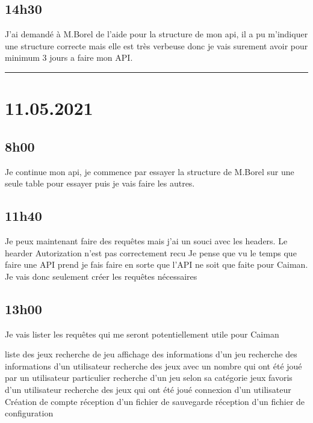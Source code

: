 \documentclass[a4paper,12pt,french]{sphinxmanual}
\begin{document}
\subsection{14h30}
\label{\detokenize{logbook:id95}}
\sphinxAtStartPar
J’ai demandé à M.Borel de l’aide pour la structure de mon api, il a pu m’indiquer une structure correcte mais elle est très verbeuse donc je vais surement avoir pour minimum 3 jours a faire mon API.


\bigskip\hrule\bigskip



\section{11.05.2021}
\label{\detokenize{logbook:id96}}

\subsection{8h00}
\label{\detokenize{logbook:id97}}
\sphinxAtStartPar
Je continue mon api, je commence par essayer la structure de M.Borel sur une seule table pour essayer puis je vais faire les autres.


\subsection{11h40}
\label{\detokenize{logbook:id98}}
\sphinxAtStartPar
Je peux maintenant faire des requêtes mais j’ai un souci avec les headers.
Le hearder Autorization n’est pas correctement recu
Je pense que vu le temps que faire une API prend je fais faire en sorte que l’API ne soit que faite pour Caiman. Je vais donc seulement créer les requêtes nécessaires


\subsection{13h00}
\label{\detokenize{logbook:id99}}
\sphinxAtStartPar
Je vais lister les requêtes qui me seront potentiellement utile pour Caiman

\sphinxAtStartPar
liste des jeux
recherche de jeu
affichage des informations d’un jeu
recherche des informations d’un utilisateur
recherche des jeux avec un nombre qui ont été joué par un utilisateur particulier
recherche d’un jeu selon sa catégorie
jeux favoris d’un utilisateur
recherche des jeux qui ont été joué
connexion d’un utilisateur
Création de compte
réception d’un fichier de sauvegarde
réception d’un fichier de configuration
\end{document}
